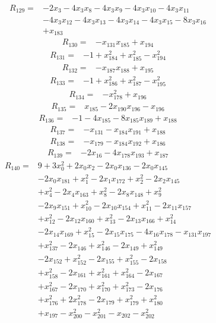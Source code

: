 \begin{align*} R_{129}={}&-2 x_{3} -4 x_{3}x_{8} -4 x_{3}x_{9} -4 x_{3}x_{10} -4 x_{3}x_{11}
\\ &-4 x_{3}x_{12} -4 x_{3}x_{13} -4 x_{3}x_{14} -4 x_{3}x_{15} -8 x_{3}x_{16}
\\ &+x_{183}
\end{align*}
\begin{align*} R_{130}={}&-x_{131}x_{185} +x_{194}
\end{align*}
\begin{align*} R_{131}={}&-1 +x_{184}^{2} +x_{185}^{2} -x_{194}^{2}
\end{align*}
\begin{align*} R_{132}={}&-x_{187}x_{188} +x_{195}
\end{align*}
\begin{align*} R_{133}={}&-1 +x_{186}^{2} +x_{187}^{2} -x_{195}^{2}
\end{align*}
\begin{align*} R_{134}={}&-x_{178}^{2} +x_{196}
\end{align*}
\begin{align*} R_{135}={}&x_{185} -2 x_{190}x_{196} -x_{196}
\end{align*}
\begin{align*} R_{136}={}&-1 -4 x_{185} -8 x_{185}x_{189} +x_{188}
\end{align*}
\begin{align*} R_{137}={}&-x_{131} -x_{184}x_{191} +x_{188}
\end{align*}
\begin{align*} R_{138}={}&-x_{179} -x_{184}x_{192} +x_{186}
\end{align*}
\begin{align*} R_{139}={}&-2 x_{16} -4 x_{178}x_{193} +x_{187}
\end{align*}
\begin{align*} R_{140}={}&9 +3 x_{0}^{2} +2 x_{0}x_{2} -2 x_{0}x_{136} -2 x_{0}x_{145}
\\ &-2 x_{0}x_{181} +x_{1}^{2} -2 x_{1}x_{172} +x_{2}^{2} -2 x_{2}x_{145}
\\ &+x_{4}^{2} -2 x_{4}x_{163} +x_{8}^{2} -2 x_{8}x_{148} +x_{9}^{2}
\\ &-2 x_{9}x_{151} +x_{10}^{2} -2 x_{10}x_{154} +x_{11}^{2} -2 x_{11}x_{157}
\\ &+x_{12}^{2} -2 x_{12}x_{160} +x_{13}^{2} -2 x_{13}x_{166} +x_{14}^{2}
\\ &-2 x_{14}x_{169} +x_{15}^{2} -2 x_{15}x_{175} -4 x_{16}x_{178} -x_{131}x_{197}
\\ &+x_{137}^{2} -2 x_{146} +x_{146}^{2} -2 x_{149} +x_{149}^{2}
\\ &-2 x_{152} +x_{152}^{2} -2 x_{155} +x_{155}^{2} -2 x_{158}
\\ &+x_{158}^{2} -2 x_{161} +x_{161}^{2} +x_{164}^{2} -2 x_{167}
\\ &+x_{167}^{2} -2 x_{170} +x_{170}^{2} +x_{173}^{2} -2 x_{176}
\\ &+x_{176}^{2} +2 x_{178}^{2} -2 x_{179} +x_{179}^{2} +x_{180}^{2}
\\ &+x_{197} -x_{200}^{2} -x_{201}^{2} -x_{202} -x_{202}^{2}
\end{align*}
